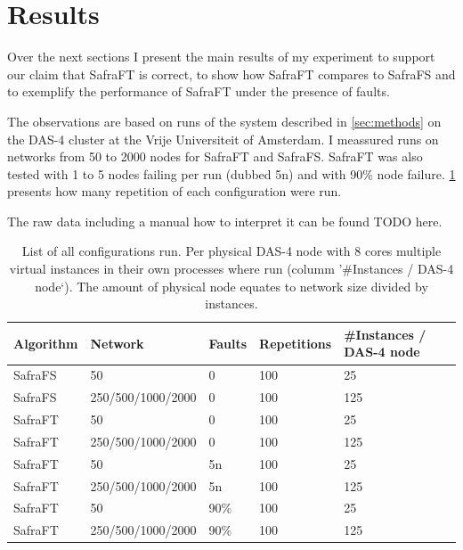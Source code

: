 \section{Results}
\label{sec:results}
Over the next sections I present the main results of my experiment to support our claim that SafraFT is correct, to show how SafraFT compares to SafraFS and to exemplify the performance of SafraFT under the presence of faults.

The observations are based on runs of the system described in \cref{sec:methods} on the DAS-4 cluster at the Vrije Universiteit of Amsterdam.
I meassured runs on networks from 50 to 2000 nodes for SafraFT and SafraFS.
SafraFT was also tested with 1 to 5 nodes failing per run (dubbed 5n) and with 90\% node failure.
\cref{table:runs} presents how many repetition of each configuration were run.

The raw data including a manual how to interpret it can be found TODO here.
\begin{table}[]
	\centering
	\begin{tabular}{@{}lllll@{}}
		\toprule
		Algorithm & Network              & Faults & Repetitions  & \#Instances / DAS-4 node   \\ \midrule
		SafraFS   & 50                   & 0      & 100          & 25                    \\
		SafraFS   & 250/500/1000/2000    & 0      & 100          & 125                   \\
		SafraFT   & 50                   & 0      & 100          & 25                    \\
		SafraFT   & 250/500/1000/2000    & 0      & 100          & 125                   \\
		SafraFT   & 50                   & 5n     & 100          & 25                    \\
		SafraFT   &    250/500/1000/2000 & 5n     & 100          & 125                   \\
	    SafraFT   & 50                   & 90\%   & 100          & 25                    \\
		SafraFT   &    250/500/1000/2000 & 90\%   & 100          & 125                   \\ \bottomrule
	\end{tabular}
	\caption{List of all configurations run. Per physical DAS-4 node with 8 cores multiple virtual instances in their own processes where run (columm '\#Instances / DAS-4 node`). The amount of physical node equates to network size divided by instances.}
	\label{table:runs}
\end{table}

